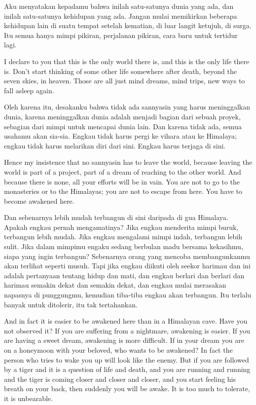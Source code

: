 \bahasa
Aku menyatakan kepadamu bahwa inilah satu-satunya dunia yang ada, dan inilah satu-satunya kehidupan yang ada. Jangan mulai memikirkan beberapa kehidupan lain di suatu tempat setelah kematian, di luar langit ketujuh, di surga. Itu semua hanya mimpi pikiran, perjalanan pikiran, cara baru untuk tertidur lagi.

\english
I declare to you that this is the only world there is, and this is the only life there is. Don't start thinking of some other life somewhere after death, beyond the seven skies, in heaven. Those are all just mind dreams, mind trips, new ways to fall asleep again.

\bahasa
Oleh karena itu, desakanku bahwa tidak ada sannyasin yang harus meninggalkan dunia, karena meninggalkan dunia adalah menjadi bagian dari sebuah proyek, sebagian dari mimpi untuk mencapai dunia lain. Dan karena tidak ada, semua usahamu akan sia-sia. Engkau tidak harus pergi ke vihara atau ke Himalaya; engkau tidak harus melarikan diri dari sini. Engkau harus terjaga di sini.

\english
Hence my insistence that no sannyasin has to leave the world, because leaving the world is part of a project, part of a dream of reaching to the other world. And because there is none, all your efforts will be in vain. You are not to go to the monasteries or to the Himalayas; you are not to escape from here. You have to become awakened here.

\bahasa
Dan sebenarnya lebih mudah terbangun di sini daripada di gua Himalaya. Apakah engkau pernah mengamatinya? Jika engkau menderita mimpi buruk, terbangun lebih mudah. Jika engkau mengalami mimpi indah, terbangun lebih sulit. Jika dalam mimpimu engaku sedang berbulan madu bersama kekasihmu, siapa yang ingin terbangun? Sebenarnya orang yang mencoba membangunkanmu akan terlihat seperti musuh. Tapi jika engkau diikuti oleh seekor harimau dan ini adalah pertanyaan tentang hidup dan mati, dan engkau berlari dan berlari dan harimau semakin dekat dan semakin dekat, dan engkau mulai merasakan napasnya di punggungmu, kemudian tiba-tiba engkau akan terbangun. Itu terlalu banyak untuk ditolerir, itu tak tertahankan.

\english
And in fact it is easier to be awakened here than in a Himalayan cave. Have you not observed it? If you are suffering from a nightmare, awakening is easier. If you are having a sweet dream, awakening is more difficult. If in your dream you are on a honeymoon with your beloved, who wants to be awakened? In fact the person who tries to wake you up will look like the enemy. But if you are followed by a tiger and it is a question of life and death, and you are running and running and the tiger is coming closer and closer and closer, and you start feeling his breath on your back, then suddenly you will be awake. It is too much to tolerate, it is unbearable.

